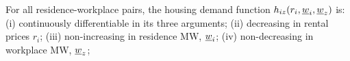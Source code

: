 \begin{assu}\label{assu:housing_function}
	For all residence-workplace pairs, the housing demand function $h_{iz} (r_i, 	
	\underline{w}_i, \underline{w}_z)$ is:
	(i) continuously differentiable in its three arguments;
	(ii) decreasing in rental prices $r_i$;
	(iii) non-increasing in residence MW, $\underline{w}_i$;
	(iv) non-decreasing in workplace MW, $\underline{w}_z$;
\end{assu}

